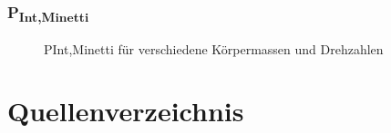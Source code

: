 \documentclass[
  letterpaper,
  DIV=11]{scrartcl}
\begin{document}
\subsubsection{\texorpdfstring{P\textsubscript{Int,Minetti}}{PInt,Minetti}}

\begin{figure}


\caption{\label{fig-PInt_Minetti}PInt,Minetti für verschiedene
Körpermassen und Drehzahlen}

\end{figure}%

\section{Quellenverzeichnis}\label{quellenverzeichnis}
\end{document}
